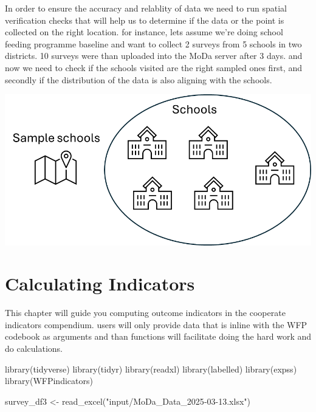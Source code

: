 \documentclass[
  letterpaper,
  DIV=11,
  numbers=noendperiod]{scrreprt}
\newenvironment{Shaded}{\begin{snugshade}}{\end{snugshade}}
\newcommand{\FunctionTok}[1]{\textcolor[rgb]{0.28,0.35,0.67}{#1}}
\newcommand{\NormalTok}[1]{\textcolor[rgb]{0.00,0.23,0.31}{#1}}
\newcommand{\OtherTok}[1]{\textcolor[rgb]{0.00,0.23,0.31}{#1}}
\newcommand{\StringTok}[1]{\textcolor[rgb]{0.13,0.47,0.30}{#1}}
\begin{document}
In order to ensure the accuracy and relablity of data we need to run
spatial verification checks that will help us to determine if the data
or the point is collected on the right location. for instance, lets
assume we're doing school feeding programme baseline and want to collect
2 surveys from 5 schools in two districts. 10 surveys were than uploaded
into the MoDa server after 3 days. and now we need to check if the
schools visited are the right sampled ones first, and secondly if the
distribution of the data is also aligning with the schools.

\includegraphics[width=1\linewidth,height=\textheight,keepaspectratio]{assets/illustrations/spatial_verification.png}


\chapter{Calculating Indicators}\label{calculating-indicators}

This chapter will guide you computing outcome indicators in the
cooperate indicators compendium. users will only provide data that is
inline with the WFP codebook as arguments and than functions will
facilitate doing the hard work and do calculations.

\begin{Shaded}
\begin{Highlighting}[]
\FunctionTok{library}\NormalTok{(tidyverse)}
\FunctionTok{library}\NormalTok{(tidyr)}
\FunctionTok{library}\NormalTok{(readxl)}
\FunctionTok{library}\NormalTok{(labelled)}
\FunctionTok{library}\NormalTok{(expss)}
\FunctionTok{library}\NormalTok{(WFPindicators)}

\NormalTok{survey\_df3 }\OtherTok{\textless{}{-}} \FunctionTok{read\_excel}\NormalTok{(}\StringTok{"input/MoDa\_Data\_2025{-}03{-}13.xlsx"}\NormalTok{)}
\end{Highlighting}
\end{Shaded}
\end{document}
